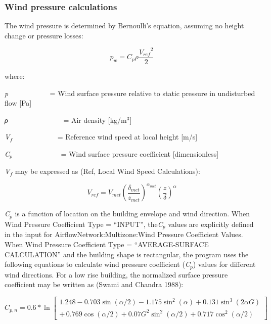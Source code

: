 \subsubsection{Wind pressure calculations}\label{wind-pressure-calculations}

The wind pressure is determined by Bernoulli's equation, assuming no height change or pressure losses:

\begin{equation}
{p_w} = {C_p}\rho \frac{{{V_{ref}}^2}}{2}
\end{equation}

where:

\emph{p\(_{ }\)}~~~~~~~~~~~ = Wind surface pressure relative to static pressure in undisturbed flow {[}Pa{]}

\emph{ρ}~~~~~~~~~~~~~~~ = Air density {[}kg/m\(^{3}\){]}

\emph{V\(_{f}\)}~~~~~~~~~~~~ = Reference wind speed at local height {[}m/s{]}

\emph{C\(_{p}\)}~~~~~~~~~~~~~ = Wind surface pressure coefficient {[}dimensionless{]}

\emph{V\(_{f}\)} may be expressed as (Ref, Local Wind Speed Calculations):

\begin{equation}
{V_{ref}} = {V_{met}}{\left( {\frac{{{\delta_{met}}}}{{{z_{met}}}}} \right)^{{\alpha_{met}}}}{\left( {\frac{z}{\delta }} \right)^\alpha }
\end{equation}

\emph{C\(_{p}\)} is a function of location on the building envelope and wind direction. When Wind Pressure Coefficient Type = ``INPUT'', the\emph{C\(_{p}\)} values are explicitly defined in the input for AirflowNetwork:Multizone:Wind Pressure Coefficient Values. When Wind Pressure Coefficient Type = ``AVERAGE-SURFACE CALCULATION'' and the building shape is rectangular, the program uses the following equations to calculate wind pressure coefficient (\emph{C\(_{p}\)}) values for different wind directions. For a low rise building, the normalized surface pressure coefficient may be written as (Swami and Chandra 1988):

\begin{equation}
{C_{p,n}} = 0.6*\ln \left[ \begin{array}{l}1.248 - 0.703\sin (\alpha /2) - 1.175{\sin ^2}(\alpha ) + 0.131{\sin ^3}(2\alpha G)\\ + \,0.769\cos (\alpha /2) + 0.07{G^2}{\sin ^2}(\alpha /2) + 0.717{\cos ^2}(\alpha /2)\end{array} \right]
\end{equation}


